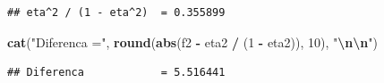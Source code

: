 \documentclass[
]{article}
\newenvironment{Shaded}{\begin{snugshade}}{\end{snugshade}}
\newcommand{\DecValTok}[1]{\textcolor[rgb]{0.00,0.00,0.81}{#1}}
\newcommand{\FunctionTok}[1]{\textcolor[rgb]{0.13,0.29,0.53}{\textbf{#1}}}
\newcommand{\NormalTok}[1]{#1}
\newcommand{\SpecialCharTok}[1]{\textcolor[rgb]{0.81,0.36,0.00}{\textbf{#1}}}
\newcommand{\StringTok}[1]{\textcolor[rgb]{0.31,0.60,0.02}{#1}}
\begin{document}
\begin{verbatim}
## eta^2 / (1 - eta^2)  = 0.355899
\end{verbatim}

\begin{Shaded}
\begin{Highlighting}[]
\FunctionTok{cat}\NormalTok{(}\StringTok{"Diferenca            ="}\NormalTok{, }\FunctionTok{round}\NormalTok{(}\FunctionTok{abs}\NormalTok{(f2 }\SpecialCharTok{{-}}\NormalTok{ eta2 }\SpecialCharTok{/}\NormalTok{ (}\DecValTok{1} \SpecialCharTok{{-}}\NormalTok{ eta2)), }\DecValTok{10}\NormalTok{), }\StringTok{"}\SpecialCharTok{\textbackslash{}n\textbackslash{}n}\StringTok{"}\NormalTok{)}
\end{Highlighting}
\end{Shaded}

\begin{verbatim}
## Diferenca            = 5.516441
\end{verbatim}
\end{document}
